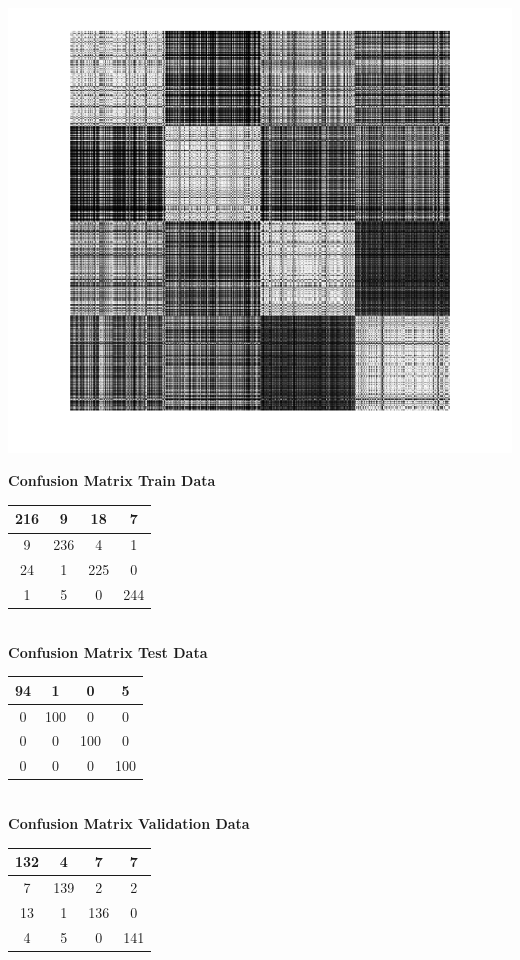\documentclass{article}
\begin{document}
\begin{center}
\includegraphics[scale=1]{Classification/1c/c_g/kgm}
\end{center}
\begin{flushleft}
\textbf{Confusion Matrix Train Data\\[5pt]}
\begin{tabular}{|c|c|c|c|}
\hline
216 & 9 & 18 & 7 \\
\hline
9 & 236 & 4 & 1 \\
\hline
24 & 1 & 225 & 0 \\
\hline
1 & 5 & 0 & 244 \\
\hline
\end{tabular}
\textbf{\\[10pt] Confusion Matrix Test Data \\[5pt]}
\begin{tabular}{|c|c|c|c|}
\hline
94 & 1 & 0 & 5 \\
\hline
0 & 100 & 0 & 0 \\
\hline
0 & 0 & 100 & 0 \\
\hline
0 & 0 & 0 & 100 \\
\hline
\end{tabular}
\textbf{\\[10pt] Confusion Matrix Validation Data \\[5pt]}
\begin{tabular}{|c|c|c|c|}
\hline
132 & 4 & 7 & 7 \\
\hline
7 & 139 & 2 & 2 \\
\hline
13 & 1 & 136 & 0 \\
\hline
4 & 5 & 0 & 141 \\
\hline
\end{tabular}
\end{flushleft}
\end{document}
